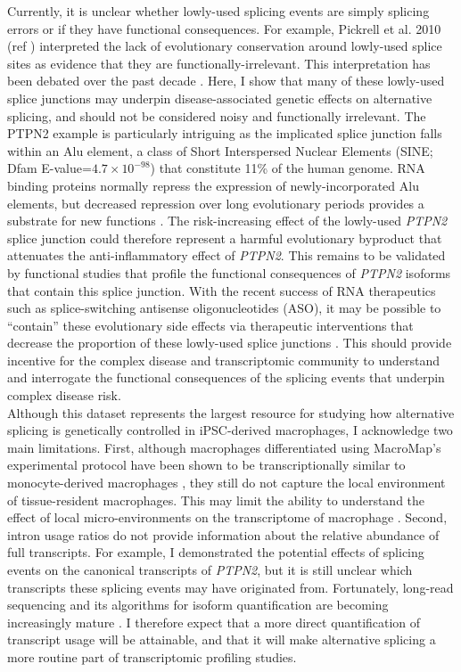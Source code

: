 Currently, it is unclear whether lowly-used splicing events are simply splicing errors \cite{Pickrell2010-lz,Melamud2009-my} or if they have functional consequences\cite{Wright2022-gp,Rotival2019-ic}. For example,  Pickrell et al. 2010 (ref \cite{Pickrell2010-lz}) interpreted the lack of evolutionary conservation around lowly-used splice sites as evidence that they are functionally-irrelevant. This interpretation has been debated over the past decade \cite{Mazin2021-lb}. Here, I show that many of these lowly-used splice junctions may underpin disease-associated genetic effects on alternative splicing, and should not be considered noisy and functionally irrelevant. The PTPN2 example is particularly intriguing as the implicated splice junction falls within an Alu element, a class of Short Interspersed Nuclear Elements (SINE; Dfam E-value=$4.7\times10^{-98}$) that constitute 11\% of the human genome\cite{Deininger2011-cx}. RNA binding proteins normally repress the expression of newly-incorporated Alu elements, but decreased repression over long evolutionary periods provides a substrate for new functions \cite{Attig2016-mj,Singer2004-km}. The risk-increasing effect of the lowly-used \textit{PTPN2} splice junction could therefore represent a harmful evolutionary byproduct that attenuates the anti-inflammatory effect of \textit{PTPN2}. This remains to be validated by functional studies that profile the functional consequences of \textit{PTPN2} isoforms that contain this splice junction. With the recent success of RNA therapeutics such as splice-switching antisense oligonucleotides (ASO), it may be possible to “contain” these evolutionary side effects via therapeutic interventions that decrease the proportion of these lowly-used splice junctions \cite{Mercuri2018-pi,Roberts2020-rx}. This should provide incentive for the complex disease and transcriptomic community to understand and interrogate the functional consequences of the splicing events that underpin complex disease risk. \\

Although this dataset represents the largest resource for studying how alternative splicing is genetically controlled in iPSC-derived macrophages, I acknowledge two main limitations. First, although macrophages differentiated using MacroMap's experimental protocol have been shown to be transcriptionally similar to monocyte-derived macrophages \cite{Alasoo2018-pv}, they still do not capture the local environment of tissue-resident macrophages. This may limit the ability to understand the effect of local micro-environments on the transcriptome of macrophage \cite{Lavin2014-fb}. Second, intron usage ratios do not provide information about the relative abundance of full transcripts. For example, I demonstrated the potential effects of splicing events on the canonical transcripts of \textit{PTPN2}, but it is still unclear which transcripts these splicing events may have originated from. Fortunately, long-read sequencing and its algorithms for isoform quantification are becoming increasingly mature \cite{AlKhafaji2021-af,Amarasinghe2020-ci,Hu2021-bv}. I therefore expect that a more direct quantification of transcript usage will be attainable, and that it will make alternative splicing a more routine part of transcriptomic profiling studies. 

